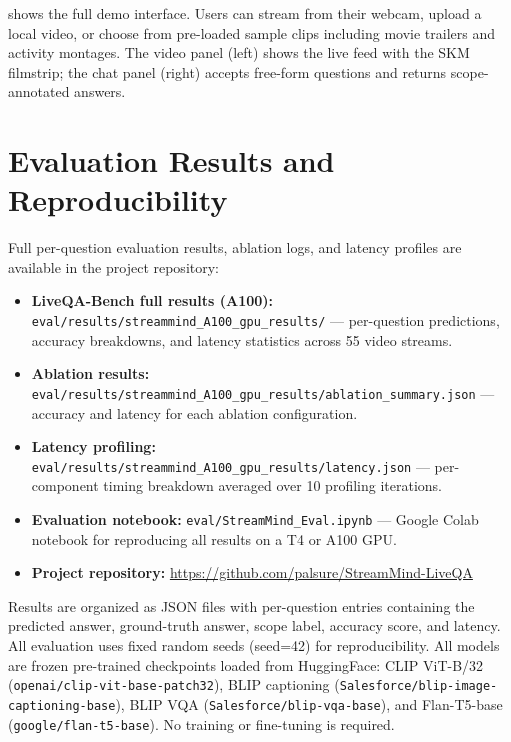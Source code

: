 \documentclass[10pt,twocolumn,letterpaper]{article}
\begin{document}
 shows the full demo interface. Users can stream from their webcam, upload a local video, or choose from pre-loaded sample clips including movie trailers and activity montages.
The video panel (left) shows the live feed with the SKM filmstrip; the chat panel (right) accepts free-form questions and returns scope-annotated answers.

\section{Evaluation Results and Reproducibility}
\label{sec:suppl_eval}

Full per-question evaluation results, ablation logs, and latency profiles are available in the project repository:

\begin{itemize}[itemsep=2pt,leftmargin=*]
  \item \textbf{LiveQA-Bench full results (A100):} \texttt{eval/results/streammind\_A100\_gpu\_results/} --- per-question predictions, accuracy breakdowns, and latency statistics across 55 video streams.
  \item \textbf{Ablation results:} \texttt{eval/results/streammind\_A100\_gpu\_results/ablation\_summary.json} --- accuracy and latency for each ablation configuration.
  \item \textbf{Latency profiling:} \texttt{eval/results/streammind\_A100\_gpu\_results/latency.json} --- per-component timing breakdown averaged over 10 profiling iterations.
  \item \textbf{Evaluation notebook:} \texttt{eval/StreamMind\_Eval.ipynb} --- Google Colab notebook for reproducing all results on a T4 or A100 GPU.
  \item \textbf{Project repository:} \url{https://github.com/palsure/StreamMind-LiveQA}
\end{itemize}

\noindent Results are organized as JSON files with per-question entries containing the predicted answer, ground-truth answer, scope label, accuracy score, and latency.
All evaluation uses fixed random seeds (seed=42) for reproducibility.
All models are frozen pre-trained checkpoints loaded from HuggingFace: CLIP ViT-B/32 (\texttt{openai/clip-vit-base-patch32}), BLIP captioning (\texttt{Salesforce/blip-image-captioning-base}), BLIP VQA (\texttt{Salesforce/blip-vqa-base}), and Flan-T5-base (\texttt{google/flan-t5-base}).
No training or fine-tuning is required.

{\small


}
\end{document}

